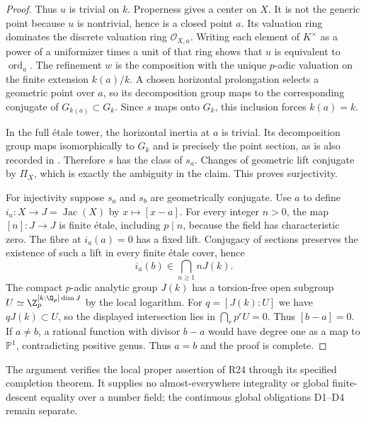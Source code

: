 \begin{proof}
Thus $u$ is trivial on $k$. Properness gives a center on $X$.
It is not the generic point because $u$ is nontrivial, hence is a
closed point $a$. Its valuation ring dominates the discrete valuation
ring $\mathcal O_{X,a}$. Writing each element of $K^\times$ as a
power of a uniformizer times a unit of that ring shows that $u$
is equivalent to $\operatorname{ord}_a$. The refinement $w$ is
the composition with the unique $p$-adic valuation on the finite
extension $k(a)/k$. A chosen horizontal prolongation selects a
geometric point over $a$, so its decomposition group maps to the
corresponding conjugate of $G_{k(a)}\subset G_k$. Since $s$ maps
onto $G_k$, this inclusion forces $k(a)=k$.

In the full \'{e}tale tower, the horizontal inertia at $a$ is
trivial. Its decomposition group maps isomorphically to $G_k$
and is precisely the point section, as is also recorded in
\citet[Section~6.1]{D_PopStix2017}. Therefore $s$ has the class
of $s_a$. Changes of geometric lift conjugate by $\Pi_X$,
which is exactly the ambiguity in the claim. This proves surjectivity.

For injectivity suppose $s_a$ and $s_b$ are geometrically conjugate.
Use $a$ to define $i_a:X\to J=\operatorname{Jac}(X)$ by
$x\mapsto[x-a]$. For every integer $n>0$, the map $[n]:J\to J$
is finite \'{e}tale, including $p\mid n$, because the field has
characteristic zero. The fibre at $i_a(a)=0$ has a fixed lift.
Conjugacy of sections preserves the existence of such a lift in
every finite \'{e}tale cover, hence
\[
                     i_a(b)\in\bigcap_{n\ge1}nJ(k).
\]
The compact $p$-adic analytic group $J(k)$ has a torsion-free open
subgroup $U\simeq\Z_p^{[k:\Q_p]\dim J}$ by the local logarithm.
For $q=[J(k):U]$ we have $qJ(k)\subset U$, so the displayed
intersection lies in $\bigcap_r p^rU=0$. Thus $[b-a]=0$.
If $a\ne b$, a rational function with divisor $b-a$ would have
degree one as a map to $\mathbb P^1$, contradicting positive genus.
Thus $a=b$ and the proof is complete.
\end{proof}

The argument verifies the local proper assertion of R24 through its
specified completion theorem. It supplies no almost-everywhere
integrality or global finite-descent equality over a number field;
the continuous global obligations D1--D4 remain separate.
